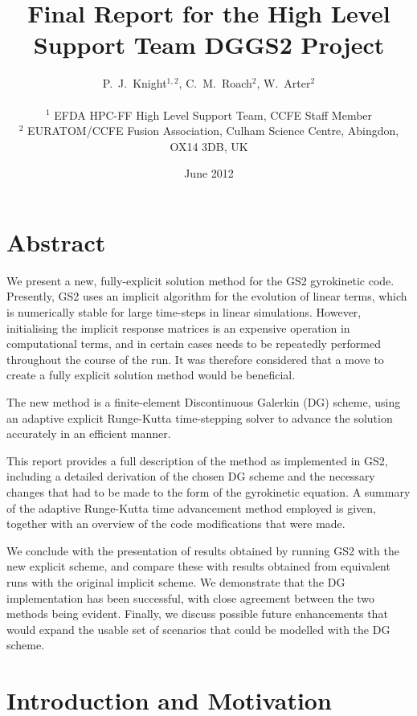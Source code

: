 \documentclass[10pt,a4paper]{article}
\title{Final Report for the High Level Support Team DGGS2 Project}
\author{P.\ J.\ Knight$^{1,2}$, C.\ M.\ Roach$^2$, W.\ Arter$^2$ \\
~\\
\small $^1$ EFDA HPC-FF High Level Support Team, CCFE Staff Member\\
\small $^2$ EURATOM/CCFE Fusion Association, Culham Science Centre, Abingdon, OX14
3DB, UK}
\date{June 2012}
\begin{document}
\maketitle

\section*{Abstract}

We present a new, fully-explicit solution method for the GS2 gyrokinetic code.
Presently, GS2 uses an implicit algorithm for the evolution of linear terms,
which is numerically stable for large time-steps in linear simulations.
However, initialising the implicit response matrices is an expensive operation
in computational terms, and in certain cases needs to be repeatedly performed
throughout the course of the run. It was therefore considered that a move to
create a fully explicit solution method would be beneficial.

The new method is a finite-element Discontinuous Galerkin (DG) scheme, using
an adaptive explicit Runge-Kutta time-stepping solver to advance the solution
accurately in an efficient manner.

This report provides a full description of the method as implemented in GS2,
including a detailed derivation of the chosen DG scheme and the necessary
changes that had to be made to the form of the gyrokinetic equation. A summary
of the adaptive Runge-Kutta time advancement method employed is given,
together with an overview of the code modifications that were made.

We conclude with the presentation of results obtained by running GS2 with the
new explicit scheme, and compare these with results obtained from equivalent
runs with the original implicit scheme. We demonstrate that the DG
implementation has been successful, with close agreement between the two
methods being evident. Finally, we discuss possible future enhancements that
would expand the usable set of scenarios that could be modelled with the DG
scheme.

\section{Introduction and Motivation}
\end{document}
